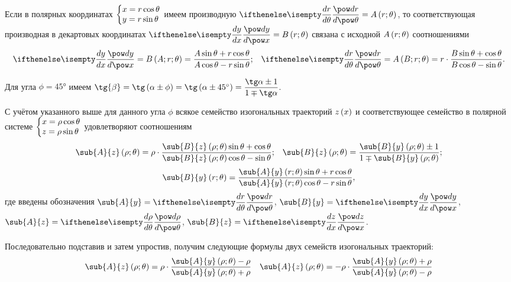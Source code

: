 \documentclass[a5paper,10pt]{article}
\begin{document}
\begin{framed}
    Если в полярных координатах
    $\tsys{x = r \cos\theta \\ y = r \sin\theta}$
    имеем производную 
    $\der{r}{\theta} = A\br{r; \theta}$,
    то соответствующая производная в декартовых координатах 
    $\der{y}{x} = B\br{r; \theta}$ связана с исходной $A\left(\hspace{0.01em}r; \theta\hspace{0.01em}\right)$ соотношениями
    \begin{align*}
        \der{y}{x}
        = B\br{A; r; \theta}
        = \dfrac {A \sin\theta + r \cos\theta} {A \cos\theta - r \sin\theta};&&
        \der{r}{\theta}
        = A\br{B; r; \theta}
        = r \cdot \dfrac {B \sin\theta + \cos\theta} {B\cos\theta - \sin\theta}.
    \end{align*}
\end{framed}

\begin{framed}
    Для угла $\phi = \ang{45}$ имеем 
    $\tg{\beta} 
    = \tg\br{\alpha \pm \phi} 
    = \tg\br{\alpha \pm \ang{45}} 
    = \dfrac {\tg\alpha \pm 1} {1 \mp \tg\alpha }$.

    С учётом указанного выше для данного угла $\phi$ 
    всякое семейство изогональных траекторий $z\left(\hspace{0.01em}x\hspace{0.01em}\right)$ 
    и соответствующее семейство в полярной системе 
    $\tsys{x = \rho \cos\theta \\ z = \rho \sin\theta}$
    удовлетворяют соотношениям
    \begin{align*}
        \sub{A}{z}\br{\rho; \theta}
        = \rho \cdot \dfrac 
        {\sub{B}{z}\br{\rho; \theta} \sin\theta + \cos\theta} 
        {\sub{B}{z}\br{\rho; \theta} \cos\theta - \sin\theta};
        &&
        \sub{B}{z}\br{\rho; \theta} = \dfrac 
        {\sub{B}{y}\br{\rho; \theta} \pm 1} 
        {1 \mp \sub{B}{y}\br{\rho; \theta}};
    \end{align*}
    $$\sub{B}{y}\br{r; \theta} = \dfrac 
    {\sub{A}{y}\br{r; \theta} \sin\theta + r \cos\theta} 
    {\sub{A}{y}\br{r; \theta} \cos\theta - r \sin\theta},$$
    где введены обозначения
    $\sub{A}{y} = \der{r}{\theta}$,
    $\sub{B}{y} = \der{y}{x}$,
    $\sub{A}{z} = \der{\rho}{\theta}$,
    $\sub{B}{z} = \der{z}{x}$.

    Последовательно подставив и затем упростив, получим 
    следующие формулы двух семейств изогональных траекторий:
    \begin{align*}
        \sub{A}{z}\br{\rho; \theta} 
        = \rho \cdot \dfrac 
        {\sub{A}{y}\br{\rho; \theta} - \rho} 
        {\sub{A}{y}\br{\rho; \theta} + \rho} &&
        \sub{A}{z}\br{\rho; \theta} 
        = -\rho \cdot \dfrac 
        {\sub{A}{y}\br{\rho; \theta} + \rho} 
        {\sub{A}{y}\br{\rho; \theta} - \rho}
    \end{align*}
\end{framed}
\end{document}
